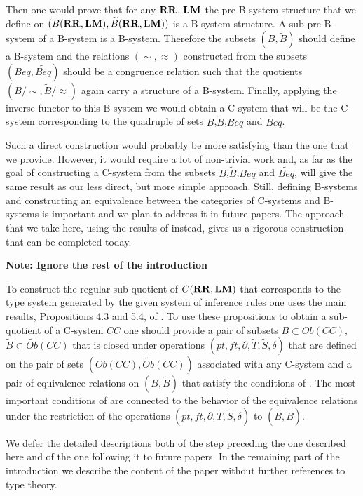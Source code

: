 \documentclass[12pt]{amsart}
\newcommand{\wt}{\widetilde}
\newcommand{\RR}{{\bf RR}}
\newcommand{\LM}{{\bf LM}}
\begin{document}
Then one would prove that for any $\RR$, $\LM$ the pre-B-system structure that we define on $(B(\RR,\LM),\wt{B}(\RR,\LM))$ is a B-system structure. A sub-pre-B-system of a B-system is a B-system. Therefore the subsets $(B,\wt{B})$ should define a B-system and the relations $(\sim,\approx)$ constructed from the subsets $(Beq,\wt{Beq})$ should be a congruence relation such that the quotients $(B/\sim,\wt{B}/\approx)$ again carry a structure of a B-system. Finally, applying the inverse functor to this B-system we would obtain a C-system that will be the C-system corresponding to the quadruple of sets $B$,$\wt{B}$,$Beq$ and $\wt{Beq}$. 

Such a direct construction would probably be more satisfying than the one that we provide. However, it would require a lot of non-trivial work and, as far as the goal of constructing a C-system from the subsets $B$,$\wt{B}$,$Beq$ and $\wt{Beq}$, will give the same result as our less direct, but more simple approach. Still, defining B-systems and constructing an equivalence between the categories of C-systems and B-systems is important and we plan to address it in future papers. The approach that we take here, using the results of \cite{Csubsystems} instead, gives us a rigorous construction that can be completed today. 


{\bf Note: Ignore the rest of the introduction}






To construct the regular sub-quotient of  $C(\RR,\LM)$ that corresponds to the type system generated by the given system of inference rules one uses the main results, Propositions 4.3 and 5.4, of \cite{Csubsystems}. To use these propositions to obtain a sub-quotient of a C-system $CC$ one should provide a pair of subsets $B\subset Ob(CC)$, $\wt{B}\subset \wt{Ob}(CC)$ that is closed under operations $(pt,ft,\partial,\wt{T},\wt{S},\delta)$ that are defined on the pair of sets $(Ob(CC),\wt{Ob}(CC))$ associated with any C-system \cite[Prop. 4.3]{Csubsystems} and a pair of equivalence relations on $(B,\wt{B})$ that satisfy the conditions of \cite[Prop. 5.4]{Csubsystems}. The most important conditions of \cite[Prop. 5.4]{Csubsystems} are connected to the behavior of the equivalence relations under the restriction of the operations $(pt,ft,\partial,\wt{T},\wt{S},\delta)$ to $(B,\wt{B})$. 







We defer the detailed descriptions both of the step preceding the one described here and of the one following it to future papers. In the remaining part of the introduction we describe the content of the paper without further references to type theory. 
\end{document}
